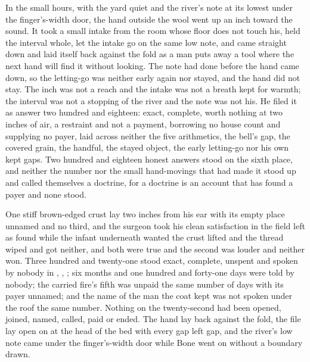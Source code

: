 In the small hours, with the yard quiet and the river's note at its lowest under the finger's-width door, the hand outside the wool went up an inch toward the sound. It took a small intake from the room whose floor does not touch his, held the interval whole, let the intake go on the same low note, and came straight down and laid itself back against the fold as a man puts away a tool where the next hand will find it without looking. The note had done before the hand came down, so the letting-go was neither early again nor stayed, and the hand did not stay. The inch was not a reach and the intake was not a breath kept for warmth; the interval was not a stopping of the river and the note was not his. He filed it as answer two hundred and eighteen: exact, complete, worth nothing at two inches of air, a restraint and not a payment, borrowing no house count and supplying no payer, laid across neither the five arithmetics, the bell's gap, the covered grain, the handful, the stayed object, the early letting-go nor his own kept gaps. Two hundred and eighteen honest answers stood on the sixth place, and neither the number nor the small hand-movings that had made it stood up and called themselves a doctrine, for a doctrine is an account that has found a payer and none stood.

One stiff brown-edged crust lay two inches from his ear with its empty place unnamed and no third, and the surgeon took his clean satisfaction in the field left as found while the infant underneath wanted the crust lifted and the thread wiped and got neither, and both were true and the second was louder and neither won. Three hundred and twenty-one stood exact, complete, unspent and spoken by nobody in , , ; six months and one hundred and forty-one days were told by nobody; the carried fire's fifth was unpaid the same number of days with its payer unnamed; and the name of the man the coat kept was not spoken under the roof the same number. Nothing on the twenty-second had been opened, joined, named, called, paid or ended. The hand lay back against the fold, the file lay open on  at the head of the bed with every gap left gap, and the river's low note came under the finger's-width door while Bone went on without a boundary drawn.
